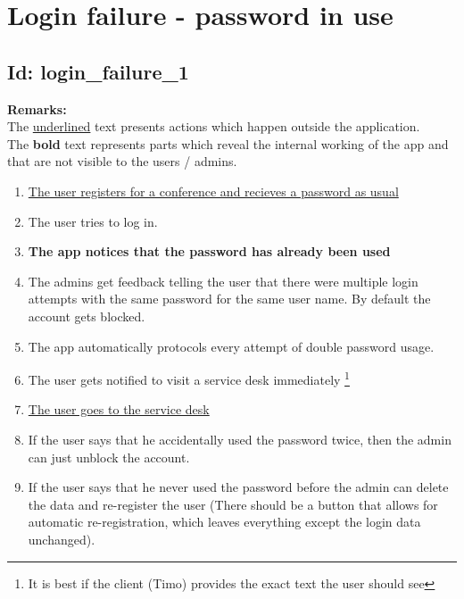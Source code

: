 \documentclass{article}
\begin{document}
\section*{Login failure - password in use}
\subsection*{Id: login\_failure\_1}
\noindent
\textbf{Remarks:}\\
 The \underline{underlined} text presents actions which happen outside the application. \\
 The \textbf{bold} text represents parts which reveal the internal working of the app and that are not visible to the users / admins.
\begin{enumerate}
	\item \underline{The user registers for a conference and recieves a password as usual}
	\item The user tries to log in.
	\item \textbf{The app notices that the password has already been used}
	\item The admins get feedback telling the user that there were multiple login attempts with the same password for the same user name. By default the account gets blocked.
	\item The app automatically protocols every attempt of double password usage.
	\item The user gets notified to visit a service desk immediately \footnote{It is best if the client (Timo) provides the exact text the user should see }
	\item \underline{The user goes to the service desk}
	\item If the user says that he accidentally used the password twice, then the admin can just unblock the account.
	\item If the user says that he never used the password before the admin can delete the data and re-register the user (There should be a button that allows for automatic re-registration, which leaves everything except the login data unchanged).

\end{enumerate}
\end{document}
